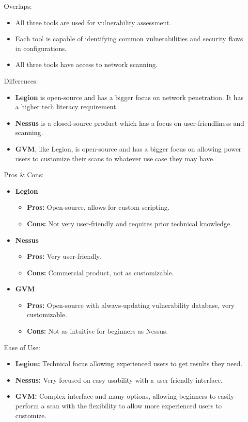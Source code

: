Overlaps:
\begin{itemize}
    \item All three tools are used for vulnerability assessment.
    \item Each tool is capable of identifying common vulnerabilities and security flaws in configurations.
    \item All three tools have access to network scanning.
\end{itemize}
Differences:
\begin{itemize}
    \item \textbf{Legion} is open-source and has a bigger focus on network penetration. It has a higher tech literacy requirement.
    \item \textbf{Nessus} is a closed-source product which has a focus on user-friendliness and scanning.
    \item \textbf{GVM}, like Legion, is open-source and has a bigger focus on allowing power users to customize their scans to whatever use case they may have.
\end{itemize}
Pros \& Cons:
\begin{itemize}
    \item \textbf{Legion}
          \begin{itemize}
              \item \textbf{Pros:} Open-source, allows for custom scripting.
              \item \textbf{Cons:} Not very user-friendly and requires prior technical knowledge.
          \end{itemize}
    \item \textbf{Nessus}
          \begin{itemize}
              \item \textbf{Pros:} Very user-friendly.
              \item \textbf{Cons:} Commercial product, not as customizable.
          \end{itemize}
    \item \textbf{GVM}
          \begin{itemize}
              \item \textbf{Pros:} Open-source with always-updating vulnerability database, very customizable.
              \item \textbf{Cons:} Not as intuitive for beginners as Nessus.
          \end{itemize}
\end{itemize}
Ease of Use:
\begin{itemize}
    \item \textbf{Legion:} Technical focus allowing experienced users to get results they need.
    \item \textbf{Nessus:} Very focused on easy usability with a user-friendly interface.
    \item \textbf{GVM:} Complex interface and many options, allowing beginners to easily perform a scan with the flexibility to allow more experienced users to customize.
\end{itemize}


